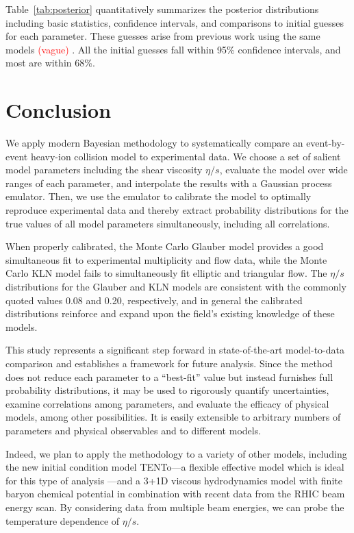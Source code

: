 \documentclass[aps,prc,reprint,superscriptaddress,amsmath]{revtex4-1}
\newcommand{\todo}[1]{\textcolor{red}{#1}}
\newcommand{\trento}{T\raisebox{-.5ex}{R}ENTo}
\begin{document}
Table~\ref{tab:posterior} quantitatively summarizes the posterior distributions including basic statistics, confidence intervals, and comparisons to initial guesses for each parameter.
These guesses arise from previous work using the same models \todo{(vague)} \cite{Shen:2011zc,Heinz:2011kt}.
All the initial guesses fall within 95\% confidence intervals, and most are within 68\%.



\section{Conclusion}

We apply modern Bayesian methodology to systematically compare an event-by-event heavy-ion collision model to experimental data.
We choose a set of salient model parameters including the shear viscosity $\eta/s$, evaluate the model over wide ranges of each parameter, and interpolate the results with a Gaussian process emulator.
Then, we use the emulator to calibrate the model to optimally reproduce experimental data and thereby extract probability distributions for the true values of all model parameters simultaneously, including all correlations.

When properly calibrated, the Monte Carlo Glauber model provides a good simultaneous fit to experimental multiplicity and flow data, while the Monte Carlo KLN model fails to simultaneously fit elliptic and triangular flow.
The $\eta/s$ distributions for the Glauber and KLN models are consistent with the commonly quoted values 0.08 and 0.20, respectively, and in general the calibrated distributions reinforce and expand upon the field's existing knowledge of these models.

This study represents a significant step forward in state-of-the-art model-to-data comparison and establishes a framework for future analysis.
Since the method does not reduce each parameter to a ``best-fit'' value but instead furnishes full probability distributions, it may be used to rigorously quantify uncertainties, examine correlations among parameters, and evaluate the efficacy of physical models, among other possibilities.
It is easily extensible to arbitrary numbers of parameters and physical observables and to different models.

Indeed, we plan to apply the methodology to a variety of other models, including the new initial condition model \trento---a flexible effective model which is ideal for this type of analysis \cite{Moreland:2014oya}---and a 3+1D viscous hydrodynamics model with finite baryon chemical potential in combination with recent data from the RHIC beam energy scan.
By considering data from multiple beam energies, we can probe the temperature dependence of $\eta/s$.
\end{document}
